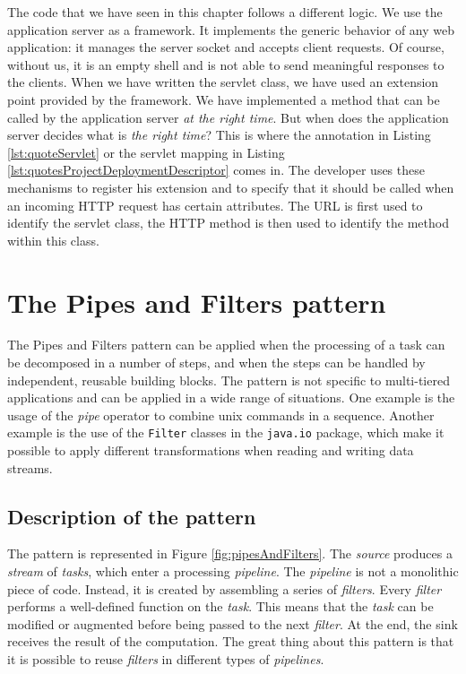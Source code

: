 The code that we have seen in this chapter follows a different logic. We use the application server as a framework. It implements the generic behavior of any web application: it manages the server socket and accepts client requests. Of course, without us, it is an empty shell and is not able to send meaningful responses to the clients. When we have written the servlet class, we have used an extension point provided by the framework. We have implemented a method that can be called by the application server \emph{at the right time}. But when does the application server decides what is \emph{the right time}? This is where the annotation in Listing \ref{lst:quoteServlet} or the servlet mapping in Listing \ref{lst:quotesProjectDeploymentDescriptor} comes in. The developer uses these mechanisms to register his extension and to specify that it should be called when an incoming HTTP request has certain attributes. The URL is first used to identify the servlet class, the HTTP method is then used to identify the method within this class.

\section{The Pipes and Filters pattern}

The Pipes and Filters pattern can be applied when the processing of a task can be decomposed in a number of steps, and when the steps can be handled by independent, reusable building blocks. The pattern is not specific to multi-tiered applications and can be applied in a wide range of situations. One example is the usage of the \emph{pipe} operator to combine unix commands in a sequence. Another example is the use of the \texttt{Filter} classes in the \texttt{java.io} package, which make it possible to apply different transformations when reading and writing data streams.

\subsection{Description of the pattern}

The pattern is represented in Figure \ref{fig:pipesAndFilters}. The \emph{source} produces a \emph{stream} of \emph{tasks}, which enter a processing \emph{pipeline}. The \emph{pipeline} is not a monolithic piece of code. Instead, it is created by assembling a series of \emph{filters}. Every \emph{filter} performs a well-defined function on the \emph{task}. This means that the \emph{task} can be modified or augmented before being passed to the next \emph{filter}. At the end, the sink receives the result of the computation. The great thing about this pattern is that it is possible to reuse \emph{filters} in different types of \emph{pipelines}. 


